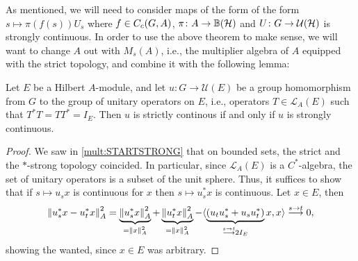 As mentioned, we will need to consider maps of the form of the form $s \mapsto \pi(f(s)) U_s$ where $f \in C_c(G,A)$, $\pi\colon  A \to \mathbb{B}(\mathcal{H})$ and $U \colon G \to \mathcal{U}(\mathcal{H})$ is strongly continuous. In order to use the above theorem to make sense, we will want to change $A$ out with $M_s(A)$, i.e., the multiplier algebra of $A$ equipped with the strict topology, and combine it with the following lemma:
\begin{lemma}
Let $E$ be a Hilbert $A$-module, and let $u \colon G \to \mathcal{U}(E)$ be a group homomorphism from $G$ to the group of unitary operators on $E$, i.e., operators $T \in \mathcal{L}_A(E)$ such that $T^*T=TT^*=I_E$. Then $u$ is strictly continous if and only if $u$ is strongly continuous.
\label{int:unistrictstrong}
\end{lemma}
\begin{proof}
We saw in \cref{mult:STARTSTRONG} that on bounded sets, the strict and the $*$-strong topology coincided. In particular, since $\mathcal{L}_A(E)$ is a $C^*$-algebra, the set of unitary operators is a subset of the unit sphere. Thus, it suffices to show that if $s \mapsto u_s x$ is continuous for $x$ then $s \mapsto u_s^* x$ is continuous. Let $x \in E$, then
\begin{align*}
	\left\lVert u_s^* x - u_t^*x \right\rVert_A^2 = \underbrace{\left\lVert u_s^* x \right\rVert_A^2}_{= \left\lVert x \right\rVert_A^2} + \underbrace{\left\lVert u_t^*x \right\rVert_A^2}_{= \left\lVert x \right\rVert_A^2} - \langle \underbrace{ \left( u_t u_s^* + u_s u_t^*  \right)}_{\stackrel{s \to t}{\longrightarrow} 2I_E} x ,x \rangle \stackrel{s \to t}{\longrightarrow} 0,
\end{align*}
showing the wanted, since $x \in E$ was arbitrary.
\end{proof}

